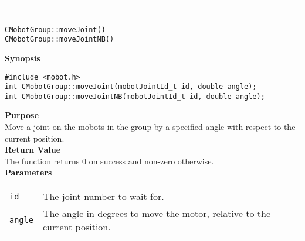 \noindent
\vspace{5pt}
\rule{4.5in}{0.015in}\\
\noindent
{\LARGE \texttt{CMobotGroup::moveJoint()}}\\
{\LARGE \texttt{CMobotGroup::moveJointNB()}}\\
{}

\noindent
{\bf Synopsis}
\vspace{-8pt}
\begin{verbatim}
#include <mobot.h>
int CMobotGroup::moveJoint(mobotJointId_t id, double angle);
int CMobotGroup::moveJointNB(mobotJointId_t id, double angle);
\end{verbatim}

\noindent
{\bf Purpose}\\
Move a joint on the mobots in the group by a specified angle with respect
to the current position.\\

\noindent
{\bf Return Value}\\
The function returns 0 on success and non-zero otherwise.\\

\noindent
{\bf Parameters}\\
\vspace{-0.1in}
\begin{description}
\item               
\begin{tabular}{p{10 mm}p{145 mm}}
\texttt{id} & The joint number to wait for. \\
\texttt{angle} & The angle in degrees to move the motor, relative to the current position.  \\
\end{tabular}
\end{description}

